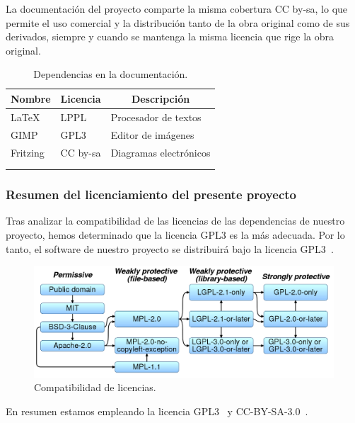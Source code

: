 La documentación del proyecto comparte la misma cobertura CC by-sa, lo que permite el uso comercial y la distribución tanto de la obra original como de sus derivados, siempre y cuando se mantenga la misma licencia que rige la obra original.

\begin{longtable}[c]{@{}lll@{}}
\toprule
\multicolumn{1}{c}{\textbf{Nombre}} & \multicolumn{1}{c}{\textbf{Licencia}} & \multicolumn{1}{c}{\textbf{Descripción}} \\* \midrule
\endfirsthead
%
\endhead
%
\bottomrule
\endfoot
%
\endlastfoot
%
\LaTeX{}~\cite{misc:Latex} & LPPL & Procesador de textos \\
GIMP & GPL3 & Editor de imágenes\\
Fritzing & CC by-sa & Diagramas electrónicos \\* \bottomrule \\
\caption{Dependencias en la documentación.}
\label{tab:my-table}\\
\end{longtable}

\subsubsection{Resumen del licenciamiento del presente proyecto}
Tras analizar la compatibilidad de las licencias de las dependencias de nuestro proyecto, hemos determinado que la licencia GPL3 es la más adecuada. Por lo tanto, el software de nuestro proyecto se distribuirá bajo la licencia GPL3~\cite{manual:GPL3}.

\begin{figure}[h!]
    \centering
    \includegraphics[width=\textwidth]{img/diagramas/licencias_compatibilidad.png}
    \caption{Compatibilidad de licencias.} \label{licencias_compatibilidad}
\end{figure}

En resumen estamos empleando la licencia GPL3~\cite{manual:GPL3} y CC-BY-SA-3.0~\cite{wiki:CreativeCommons}.

